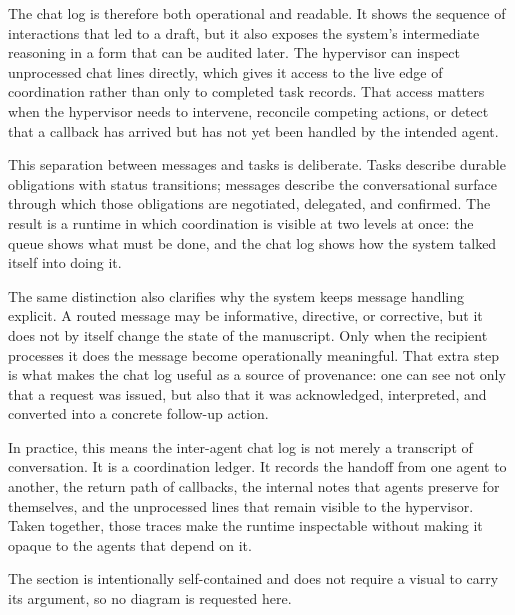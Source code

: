 \documentclass[11pt]{article}
\begin{document}
The chat log is therefore both operational and readable. It shows the sequence of interactions that led to a draft, but it also exposes the system's intermediate reasoning in a form that can be audited later. The hypervisor can inspect unprocessed chat lines directly, which gives it access to the live edge of coordination rather than only to completed task records. That access matters when the hypervisor needs to intervene, reconcile competing actions, or detect that a callback has arrived but has not yet been handled by the intended agent.

This separation between messages and tasks is deliberate. Tasks describe durable obligations with status transitions; messages describe the conversational surface through which those obligations are negotiated, delegated, and confirmed. The result is a runtime in which coordination is visible at two levels at once: the queue shows what must be done, and the chat log shows how the system talked itself into doing it.

The same distinction also clarifies why the system keeps message handling explicit. A routed message may be informative, directive, or corrective, but it does not by itself change the state of the manuscript. Only when the recipient processes it does the message become operationally meaningful. That extra step is what makes the chat log useful as a source of provenance: one can see not only that a request was issued, but also that it was acknowledged, interpreted, and converted into a concrete follow-up action.

In practice, this means the inter-agent chat log is not merely a transcript of conversation. It is a coordination ledger. It records the handoff from one agent to another, the return path of callbacks, the internal notes that agents preserve for themselves, and the unprocessed lines that remain visible to the hypervisor. Taken together, those traces make the runtime inspectable without making it opaque to the agents that depend on it.

The section is intentionally self-contained and does not require a visual to carry its argument, so no diagram is requested here.
\end{document}
